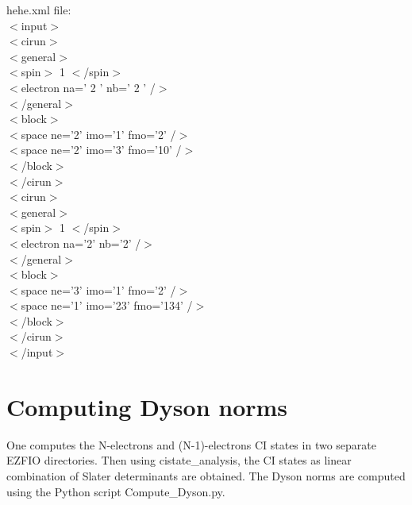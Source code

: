 \documentclass[a4paper, 10 pt]{report}
\begin{document}
\noindent hehe.xml file:\\
$<$input$>$\\
$<$cirun$>$\\
$<$general$>$\\
$<$spin$>$ 1 $<$/spin$>$\\
$<$electron na=' 2 ' nb=' 2 ' /$>$\\
$<$/general$>$\\
$<$block$>$\\
$<$space ne='2' imo='1' fmo='2' /$>$\\
$<$space ne='2' imo='3' fmo='10' /$>$\\
$<$/block$>$\\
$<$/cirun$>$\\
$<$cirun$>$\\
$<$general$>$\\
$<$spin$>$ 1 $<$/spin$>$\\
$<$electron na='2' nb='2' /$>$\\
$<$/general$>$\\
$<$block$>$\\
$<$space ne='3' imo='1' fmo='2' /$>$\\
$<$space ne='1' imo='23' fmo='134' /$>$\\
$<$/block$>$\\
$<$/cirun$>$\\
$<$/input$>$\\

\section{Computing Dyson norms}

One computes the N-electrons and (N-1)-electrons CI states in two separate EZFIO directories. Then using cistate\_analysis, the CI states as linear combination of Slater determinants are obtained. The Dyson norms are computed using the Python script Compute\_Dyson.py.\\
\end{document}
